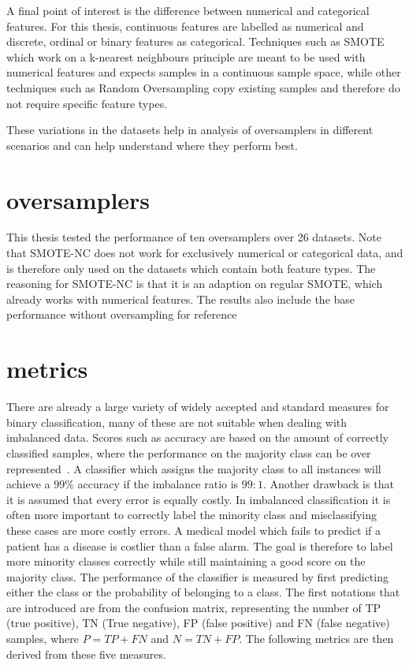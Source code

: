 A final point of interest is the difference between numerical and categorical features. For this thesis, continuous features are labelled as numerical and discrete, ordinal or binary features as categorical. Techniques such as SMOTE which work on a k-nearest neighbours principle are meant to be used with numerical features and expects samples in a continuous sample space, while other techniques such as Random Oversampling copy existing samples and therefore do not require specific feature types.

These variations in the datasets help in analysis of oversamplers in different scenarios and can help understand where they perform best.

\section{oversamplers}
This thesis tested the performance of ten oversamplers over 26 datasets. Note that SMOTE-NC does not work for exclusively numerical or categorical data, and is therefore only used on the datasets which contain both feature types. The reasoning for SMOTE-NC is that it is an adaption on regular SMOTE, which already works with numerical features. The results also include the base performance without oversampling for reference 

\section{metrics}
There are already a large variety of widely accepted and standard measures for binary classification, many of these are not suitable when dealing with imbalanced data. Scores such as accuracy are based on the amount of correctly classified samples, where the performance on the majority class can be over represented~\cite{Fernandez2018LearningSets}. A classifier which assigns the majority class to all instances will achieve a $99\%$ accuracy if the imbalance ratio is $99:1$. Another drawback is that it is assumed that every error is equally costly. In imbalanced classification it is often more important to correctly label the minority class and misclassifying these cases are more costly errors. A medical model which fails to predict if a patient has a disease is costlier than a false alarm. The goal is therefore to label more minority classes correctly while still maintaining a good score on the majority class. The performance of the classifier is measured by first predicting either the class or the probability of belonging to a class. The first notations that are introduced are from the confusion matrix, representing the number of TP (true positive), TN (True negative), FP (false positive) and FN (false negative) samples, where $P = TP + FN$ and $N = TN + FP$. The following metrics are then derived from these five measures.

